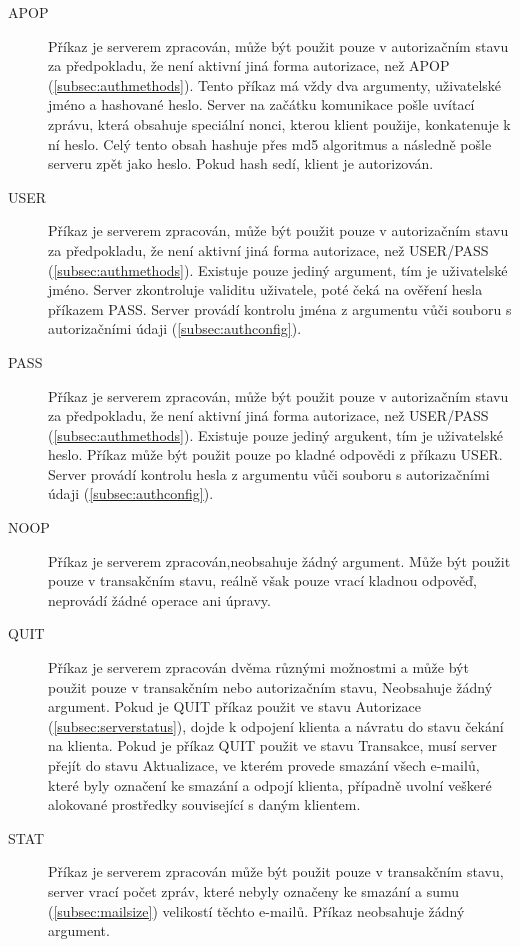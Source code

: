\documentclass[11pt,a4paper]{report}
\begin{document}
    \begin{description}
        \item[APOP] Příkaz je serverem zpracován, může být použit pouze v autorizačním stavu za předpokladu, že není aktivní jiná forma autorizace, než APOP (\ref{subsec:authmethods}). Tento příkaz má vždy dva argumenty, uživatelské jméno a hashované heslo. Server na začátku komunikace pošle uvítací zprávu, která obsahuje speciální nonci, kterou klient použije, konkatenuje k ní heslo. Celý tento obsah hashuje přes md5 algoritmus a následně pošle serveru zpět jako heslo. Pokud hash sedí, klient je autorizován.
        \item[USER] Příkaz je serverem zpracován, může být použit pouze v autorizačním stavu za předpokladu, že není aktivní jiná forma autorizace, než USER/PASS (\ref{subsec:authmethods}). Existuje pouze jediný argument, tím je uživatelské jméno. Server zkontroluje validitu uživatele, poté čeká na ověření hesla příkazem PASS. Server provádí kontrolu jména z argumentu vůči souboru s autorizačními údaji (\ref{subsec:authconfig}).
        \item[PASS] Příkaz je serverem zpracován, může být použit pouze v autorizačním stavu za předpokladu, že není aktivní jiná forma autorizace, než USER/PASS (\ref{subsec:authmethods}). Existuje pouze jediný argukent, tím je uživatelské heslo. Příkaz může být použit pouze po kladné odpovědi z příkazu USER. Server provádí kontrolu hesla z argumentu vůči souboru s autorizačními údaji (\ref{subsec:authconfig}).
        \item[NOOP] Příkaz je serverem zpracován,neobsahuje žádný argument. Může být použit pouze v transakčním stavu, reálně však pouze vrací kladnou odpověď, neprovádí žádné operace ani úpravy.
        \item[QUIT] Příkaz je serverem zpracován dvěma různými možnostmi a může být použit pouze v transakčním nebo autorizačním stavu, Neobsahuje žádný argument. Pokud je QUIT příkaz použit ve stavu Autorizace (\ref{subsec:serverstatus}), dojde k odpojení klienta a návratu do stavu čekání na klienta. Pokud je příkaz QUIT použit ve stavu Transakce, musí server přejít do stavu Aktualizace, ve kterém provede smazání všech e-mailů, které byly označení ke smazání a odpojí klienta, případně uvolní veškeré alokované prostředky související s daným klientem.
        \item[STAT] Příkaz je serverem zpracován může být použit pouze v transakčním stavu, server vrací počet zpráv, které nebyly označeny ke smazání a sumu (\ref{subsec:mailsize}) velikostí těchto e-mailů. Příkaz neobsahuje žádný argument.

\end{description}
\end{document}
